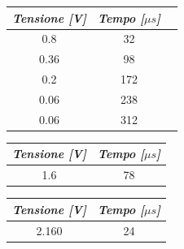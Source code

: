     \begin{table} [!ht]
        \begin{minipage}{.34\linewidth}
            \centering
            \begin{tabular}{|c|c|c|}
                \hline
                \textit{Tensione [V]} & \textit{Tempo [$\mu s$]} \\
                \hline
                0.8 & 32 \\
                \hline
                0.36 & 98 \\
                \hline
                0.2 & 172 \\
                \hline
                0.06 & 238 \\
                \hline
                0.06 & 312 \\
                \hline
            \end{tabular}
        \end{minipage}
        \begin{minipage}{.34\linewidth}
            \centering
            \begin{tabular}{|c|c|}
                \hline
                \textit{Tensione [V]} & \textit{Tempo [$\mu s$]} \\
                \hline
                1.6 & 78 \\            
                \hline
            \end{tabular}
        \end{minipage}
        \begin{minipage}{.34\linewidth}
            \centering
            \begin{tabular}{|c|c|}
                \hline
                \textit{Tensione [V]} & \textit{Tempo [$\mu s$]} \\
                \hline
                2.160 & 24 \\ 
                \hline
            \end{tabular}
        \end{minipage}
    \end{table}


